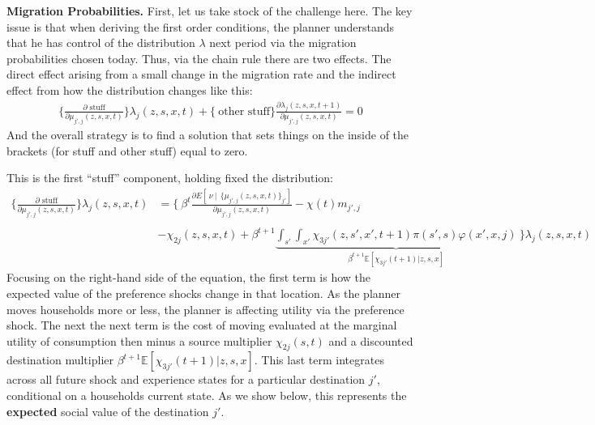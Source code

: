 \documentclass[12pt,pdftex]{article}
\begin{document}
\textbf{Migration Probabilities.} First, let us take stock of the challenge here. The key issue is that when deriving the first order conditions, the planner understands that he has control of the distribution $\lambda$ next period via the migration probabilities chosen today. Thus, via the chain rule there are two effects. The direct effect arising from a small change in the migration rate and the indirect effect from how the distribution changes like this:
\begin{align}
\bigg \{ \frac{\partial \mbox{ stuff}}{\partial \mu_{j',j}(z, s, x, t)} \bigg \}\lambda_{j}(z, s, x, t) + \bigg \{ \ \mbox{other \ stuff} \bigg \} \frac{\partial \lambda_{j}(z, s, x,  t+1)}{\partial \mu_{j',j}(z, s, x, t)} = 0
\label{appendix-eq:stuff}
\end{align}
And the overall strategy is to find a solution that sets things on the inside of the brackets (for stuff and other stuff) equal to zero.

This is the first ``stuff'' component, holding fixed the distribution:
{\small
\begin{align}
\bigg \{\frac{\partial \mbox{ stuff}}{\partial \mu_{j',j}(z, s,x, t)} \bigg \}\lambda_{j}(z, s, x, t) &= \Bigg \{ \  \beta^{t} \frac{\partial E[\ \nu \ | \ \ \big\{\mu_{j',j}(z,s,x,t)\big\}_{j'}]}{\partial \mu_{j',j}(z,s,x,t)} - \chi(t) m_{j',j} \nonumber \\
\nonumber \\
& - \chi_{2j}(z,s,x,t)  + \beta^{t+1}\underbrace{\int_{s'}\int_{x'}\chi_{3j'}(z,s',x',t+1) \pi(s',s) \varphi(x',x, j)}_{\beta^{t+1}\mathbb{E}\left[\chi_{3j'}(t+1)|z, s, x \right]} \ \Bigg  \} \lambda_{j}(z,s,x,t)
\label{appendix-eq:first_stuff_foc}
\end{align}}Focusing on the right-hand side of the equation, the first term is how the expected value of the preference shocks change in that location. As the planner moves households more or less, the planner is affecting utility via the preference shock. The next the next term is the cost of moving evaluated at the marginal utility of consumption then minus a source multiplier $\chi_{2j}(s,t)$ and a discounted destination multiplier $\beta^{t+1}\mathbb{E}\left[\chi_{3j'}(t+1)|z, s, x \right]$. This last term integrates across all future shock and experience states for a particular destination $j'$, conditional on a households current state. As we show below, this represents the \textbf{expected} social value of the destination $j'$.
\end{document}
